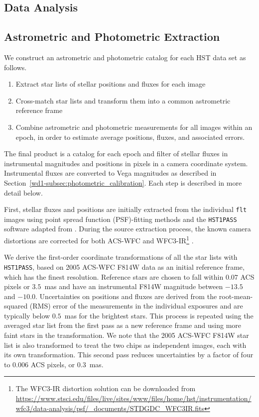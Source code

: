\documentclass[12pt]{ucsddissertation}
\begin{document}
\begin{CJK*}{UTF8}{gbsn}
\section{Data Analysis}
\label{wd1-sec:data}
\subsection{Astrometric and Photometric Extraction}
\label{wd1-subsec:astrometry_photometry}

We construct an astrometric and photometric catalog for each HST data set as follows. 

\begin{enumerate}[leftmargin=*, label=\roman*., align=left, labelsep=0em, itemsep=0em]
\item Extract star lists of stellar positions and fluxes for each image
\item Cross-match star lists and transform them into a common astrometric reference frame
\item Combine astrometric and photometric measurements for all images within an epoch, in order to estimate average positions, fluxes, and associated errors.  
\end{enumerate}

The final product is a catalog for each epoch and filter of stellar fluxes in instrumental magnitudes and positions in pixels in a camera coordinate system. 
Instrumental fluxes are converted to Vega magnitudes as described in Section~\ref{wd1-subsec:photometric_calibration}. 
Each step is described in more detail below. 

First, stellar fluxes and positions are initially extracted from the individual \texttt{flt} images using point spread function (PSF)-fitting methods and the \texttt{HST1PASS} software adapted from \citet{Anderson-2022}.  During the source extraction process, the known camera distortions are corrected for both ACS-WFC and WFC3-IR\footnote{The WFC3-IR distortion solution can be downloaded from \url{https://www.stsci.edu/files/live/sites/www/files/home/hst/instrumentation/wfc3/data-analysis/psf/_documents/STDGDC_WFC3IR.fits}} \citep{Anderson-2006}.

We derive the first-order coordinate transformations of all the star lists with \texttt{HST1PASS}, based on 2005 ACS-WFC F814W data as an initial reference frame, which has the finest resolution. Reference stars are chosen to fall within $0.07$ ACS pixels or $3.5$~mas and have an instrumental F814W magnitude between $-13.5$ and $-10.0$. Uncertainties on positions and fluxes are derived from the root-mean-squared (RMS) error of the measurements in the individual exposures and are typically below $0.5$~mas for the brightest stars. This process is repeated using the averaged star list from the first pass as a new reference frame and using more faint stars in the transformation. We note that the 2005 ACS-WFC F814W star list is also transformed to treat the two chips as independent images, each with its own transformation. This second pass reduces uncertainties by a factor of four to $0.006$ ACS pixels, or $0.3$~mas.


\end{CJK*}
\end{document}
